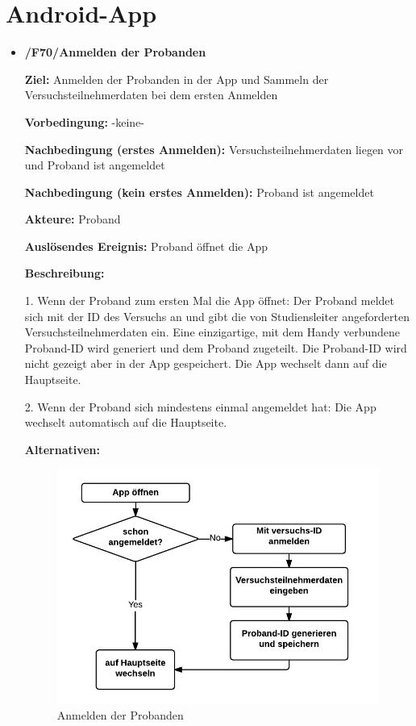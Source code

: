 \documentclass[a4paper]{scrreprt}
\begin{document}
    \newpage
    \section{\gls{Android-App}}

        \begin{itemize}
            \item \textbf{/F70/Anmelden der \gls{Proband}en}

                \par \textbf{Ziel: }Anmelden der \gls{Proband}en in der App und Sammeln der Versuchsteilnehmerdaten bei dem ersten Anmelden
                \par \textbf{Vorbedingung: }-keine-
                \par \textbf{Nachbedingung (erstes Anmelden): }Versuchsteilnehmerdaten liegen vor und \gls{Proband} ist angemeldet
                \par \textbf{Nachbedingung (kein erstes Anmelden): }\gls{Proband} ist angemeldet
                \par \textbf{Akteure: }\gls{Proband}
                \par \textbf{Auslösendes Ereignis: }\gls{Proband} öffnet die App
                \par \textbf{Beschreibung: }
                \par 1. Wenn der \gls{Proband} zum ersten Mal die App öffnet: Der \gls{Proband} meldet sich mit der ID des Versuchs an und gibt die
                 von \gls{Studiensleiter} angeforderten Versuchsteilnehmerdaten ein. Eine einzigartige, mit dem Handy verbundene \gls{Proband}-ID wird generiert und dem \gls{Proband} zugeteilt. Die \gls{Proband}-ID wird nicht gezeigt aber in der App gespeichert. Die App wechselt dann auf die Hauptseite.
                \par 2. Wenn der \gls{Proband} sich mindestens einmal angemeldet hat: Die App wechselt automatisch auf die Hauptseite.
                \par \textbf{Alternativen: }
                \begin{figure}[ht]
                    \centering
                    \includegraphics[scale=1]{AppAnmelden.jpeg}
                    \caption{Anmelden der \gls{Proband}en}
                \end{figure}



\end{itemize}
\end{document}
